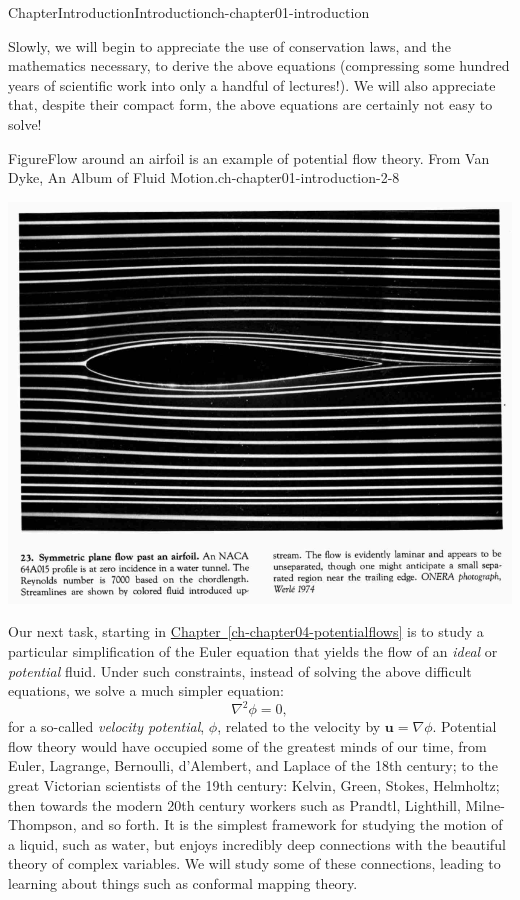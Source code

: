 \documentclass[oneside,10pt,]{book}
\newcommand{\xreffont}{\relax}
\numberwithin{equation}{section}
\newcommand{\bu}{\boldsymbol{u}}
\begin{document}
\begin{chapterptx}{Chapter}{Introduction}{}{Introduction}{}{}{ch-chapter01-introduction}
\begin{introduction}{}
Slowly, we will begin to appreciate the use of conservation laws, and the mathematics necessary, to derive the above equations (compressing some hundred years of scientific work into only a handful of lectures!). We will also appreciate that, despite their compact form, the above equations are certainly not easy to solve!%
\begin{figureptx}{Figure}{Flow around an airfoil is an example of potential flow theory. From Van Dyke, An Album of Fluid Motion.}{ch-chapter01-introduction-2-8}{}%
\begin{image}{0}{1}{0}{}%
\includegraphics[width=\linewidth]{external/airfoil.png}
\end{image}%
\tcblower
\end{figureptx}%
Our next task, starting in \hyperref[ch-chapter04-potentialflows]{Chapter~{\xreffont\ref{ch-chapter04-potentialflows}}} is to study a particular simplification of the Euler equation that yields the flow of an \emph{ideal} or \emph{potential} fluid. Under such constraints, instead of solving the above difficult equations, we solve a much simpler equation:%
\begin{equation*}
\nabla^2 \phi = 0,
\end{equation*}
for a so-called \emph{velocity potential}, \(\phi\), related to the velocity by \(\bu = \nabla \phi\). Potential flow theory would have occupied some of the greatest minds of our time, from Euler, Lagrange, Bernoulli, d'Alembert, and Laplace of the 18th century; to the great Victorian scientists of the 19th century: Kelvin, Green, Stokes, Helmholtz; then towards the modern 20th century workers such as Prandtl, Lighthill, Milne-Thompson, and so forth. It is the simplest framework for studying the motion of a liquid, such as water, but enjoys incredibly deep connections with the beautiful theory of complex variables. We will study some of these connections, leading to learning about things such as conformal mapping theory.%

\end{introduction}
\end{chapterptx}
\end{document}
